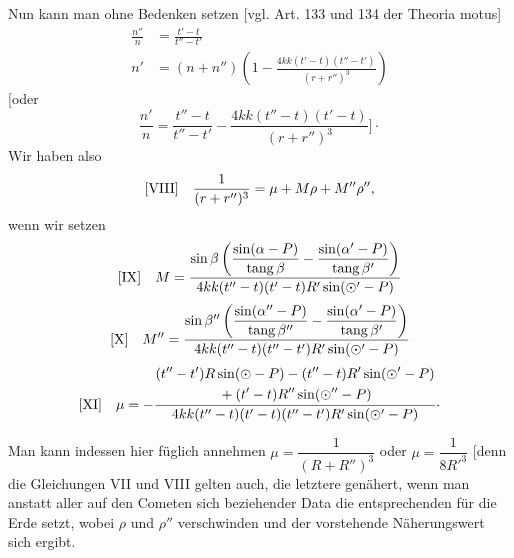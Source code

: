 Nun kann man ohne Bedenken setzen [vgl. Art. 133 und 134 der Theoria motus]
\[
\begin{aligned}
\frac{n''}{n}&=\frac{t'-t}{t''-t'}\\
n'&=(n+n'')\left(1-\frac{4kk(t'-t)(t''-t')}{(r+r'')^3}\right)
\end{aligned}
\]
[oder
\[
\frac{n'}{n}=\frac{t''-t}{t''-t'}-\frac{4kk(t''-t)(t'-t)}{(r+r'')^3}\Biggr]\mathpunct{\cdot}
\]
Wir haben also
\[
\begin{array}{l@{\quad}l}
[\mathrm{VIII}]&\displaystyle\frac{1}{(r+r'')^3}=\mu+M\rho+M''\rho'',
\end{array}
\]
wenn wir setzen
\[
\begin{array}{l@{\quad}l}
[\mathrm{IX}]&\displaystyle M=\frac{\sin\beta\left(\dfrac{\sin(\alpha-P)}{\operatorname{tang}\beta}-\dfrac{\sin(\alpha'-P)}{\operatorname{tang}\beta'}\right)}{4kk(t''-t)(t'-t)R'\sin(\odot'-P)}
\end{array}
\]
\[
\begin{array}{l@{\quad}l}
[\mathrm{X}]&\displaystyle M''=\frac{\sin\beta''\left(\dfrac{\sin(\alpha''-P)}{\operatorname{tang}\beta''}-\dfrac{\sin(\alpha'-P)}{\operatorname{tang}\beta'}\right)}{4kk(t''-t)(t''-t')R'\sin(\odot'-P)}
\end{array}
\]
\[
\begin{array}{l@{\quad}l}
[\mathrm{XI}]&\displaystyle\mu=-\frac{\begin{gathered}(t''-t')R\sin(\odot-P)-(t''-t)R'\sin(\odot'-P)\\{}+(t'-t)R''\sin(\odot''-P)\end{gathered}}{4kk(t''-t)(t'-t)(t''-t')R'\sin(\odot'-P)}\mathpunct{\cdot}
\end{array}
\]

Man kann indessen hier füglich annehmen \(\mu=\dfrac{1}{(R+R'')^3}\) oder \(\mu=\dfrac{1}{8R'^3}\) [denn die Gleichungen VII und VIII gelten auch, die letztere genähert, wenn man anstatt aller auf den Cometen sich beziehender Data die entsprechenden für die Erde setzt, wobei \(\rho\) und \(\rho''\) verschwinden und der vorstehende Näherungswert sich ergibt.

